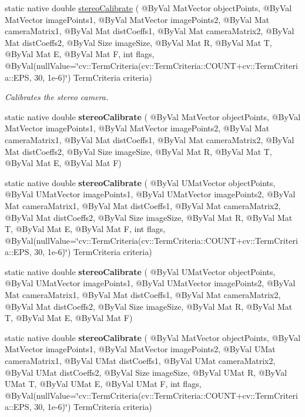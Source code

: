 \begin{DoxyCompactItemize}
\item 
static native double \hyperlink{group__calib3d_gab585e0688b9d7592dfe294c5179bdcae}{stereo\+Calibrate} ( @By\+Val Mat\+Vector object\+Points, @By\+Val Mat\+Vector image\+Points1, @By\+Val Mat\+Vector image\+Points2, @By\+Val Mat camera\+Matrix1, @By\+Val Mat dist\+Coeffs1, @By\+Val Mat camera\+Matrix2, @By\+Val Mat dist\+Coeffs2, @By\+Val Size image\+Size, @By\+Val Mat R, @By\+Val Mat T, @By\+Val Mat E, @By\+Val Mat F, int flags, @By\+Val(null\+Value=\char`\"{}cv\+::\+Term\+Criteria(cv\+::\+Term\+Criteria\+::\+C\+O\+U\+NT+cv\+::\+Term\+Criteria\+::\+E\+PS, 30, 1e-\/6)\char`\"{}) Term\+Criteria criteria)
\begin{DoxyCompactList}\small\item\em Calibrates the stereo camera. \end{DoxyCompactList}\item 
static native double {\bfseries stereo\+Calibrate} ( @By\+Val Mat\+Vector object\+Points, @By\+Val Mat\+Vector image\+Points1, @By\+Val Mat\+Vector image\+Points2, @By\+Val Mat camera\+Matrix1, @By\+Val Mat dist\+Coeffs1, @By\+Val Mat camera\+Matrix2, @By\+Val Mat dist\+Coeffs2, @By\+Val Size image\+Size, @By\+Val Mat R, @By\+Val Mat T, @By\+Val Mat E, @By\+Val Mat F)
\item 
static native double {\bfseries stereo\+Calibrate} ( @By\+Val U\+Mat\+Vector object\+Points, @By\+Val U\+Mat\+Vector image\+Points1, @By\+Val U\+Mat\+Vector image\+Points2, @By\+Val Mat camera\+Matrix1, @By\+Val Mat dist\+Coeffs1, @By\+Val Mat camera\+Matrix2, @By\+Val Mat dist\+Coeffs2, @By\+Val Size image\+Size, @By\+Val Mat R, @By\+Val Mat T, @By\+Val Mat E, @By\+Val Mat F, int flags, @By\+Val(null\+Value=\char`\"{}cv\+::\+Term\+Criteria(cv\+::\+Term\+Criteria\+::\+C\+O\+U\+NT+cv\+::\+Term\+Criteria\+::\+E\+PS, 30, 1e-\/6)\char`\"{}) Term\+Criteria criteria)
\item 
static native double {\bfseries stereo\+Calibrate} ( @By\+Val U\+Mat\+Vector object\+Points, @By\+Val U\+Mat\+Vector image\+Points1, @By\+Val U\+Mat\+Vector image\+Points2, @By\+Val Mat camera\+Matrix1, @By\+Val Mat dist\+Coeffs1, @By\+Val Mat camera\+Matrix2, @By\+Val Mat dist\+Coeffs2, @By\+Val Size image\+Size, @By\+Val Mat R, @By\+Val Mat T, @By\+Val Mat E, @By\+Val Mat F)
\item 
static native double {\bfseries stereo\+Calibrate} ( @By\+Val Mat\+Vector object\+Points, @By\+Val Mat\+Vector image\+Points1, @By\+Val Mat\+Vector image\+Points2, @By\+Val U\+Mat camera\+Matrix1, @By\+Val U\+Mat dist\+Coeffs1, @By\+Val U\+Mat camera\+Matrix2, @By\+Val U\+Mat dist\+Coeffs2, @By\+Val Size image\+Size, @By\+Val U\+Mat R, @By\+Val U\+Mat T, @By\+Val U\+Mat E, @By\+Val U\+Mat F, int flags, @By\+Val(null\+Value=\char`\"{}cv\+::\+Term\+Criteria(cv\+::\+Term\+Criteria\+::\+C\+O\+U\+NT+cv\+::\+Term\+Criteria\+::\+E\+PS, 30, 1e-\/6)\char`\"{}) Term\+Criteria criteria)

\end{DoxyCompactItemize}
